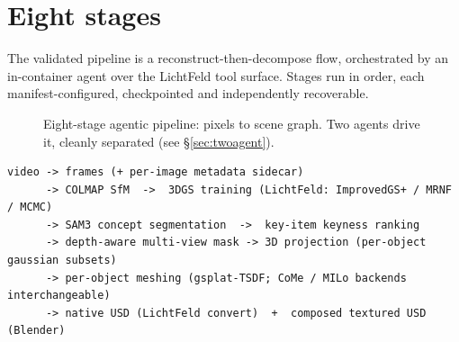 \documentclass[a4paper,11pt]{report}
\begin{document}
\section{Eight stages}
The validated pipeline is a reconstruct-then-decompose flow, orchestrated by an in-container agent over the
LichtFeld tool surface. Stages run in order, each manifest-configured, checkpointed and independently
recoverable.

\begin{figure}[ht]
\centering
{}
\caption{Eight-stage agentic pipeline: pixels to scene graph. Two agents drive it, cleanly separated (see
\S\ref{sec:twoagent}).}\label{fig:pipeline}
\end{figure}

\begin{lstlisting}[caption={The validated path, in order.}]
video -> frames (+ per-image metadata sidecar)
      -> COLMAP SfM  ->  3DGS training (LichtFeld: ImprovedGS+ / MRNF / MCMC)
      -> SAM3 concept segmentation  ->  key-item keyness ranking
      -> depth-aware multi-view mask -> 3D projection (per-object gaussian subsets)
      -> per-object meshing (gsplat-TSDF; CoMe / MILo backends interchangeable)
      -> native USD (LichtFeld convert)  +  composed textured USD (Blender)
\end{lstlisting}
\end{document}
